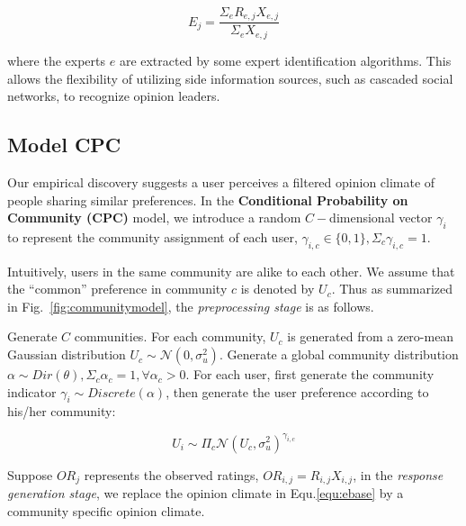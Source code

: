 \documentclass[sigconf]{acmart}
\begin{document}
\begin{equation}\label{eexpert}
E_j = \frac{\Sigma_e R_{e,j}X_{e,j}}{\Sigma_e X_{e,j}}
\end{equation}

where the experts $e$ are extracted by some expert identification algorithms. This allows the flexibility of utilizing side information sources, such as cascaded social networks, to recognize opinion leaders.

\subsection{Model CPC}
Our empirical discovery suggests a user perceives a filtered opinion climate of people sharing similar preferences. In the \textbf{Conditional Probability on Community (CPC)} model, we introduce a random $C-$dimensional vector $\gamma_i$ to represent the community assignment of each user,  $\gamma_{i,c}\in \{0,1\}, \Sigma_c \gamma_{i,c}=1$.


Intuitively, users in the same community are alike to each other. We assume that the ``common'' preference in community $c$ is denoted by $U_c$. Thus as summarized in Fig.~\ref{fig:communitymodel}, the \textit{preprocessing stage} is as follows.

Generate $C$ communities. For each community, $U_c$ is generated from a zero-mean Gaussian distribution $U_c \sim \mathcal{N}(0,\sigma_u^2)$. Generate a global community distribution $\alpha\sim Dir(\theta), \Sigma_c \alpha_c=1, \forall \alpha_c>0$. For each user, first generate the community indicator $\gamma_i \sim Discrete(\alpha)$, then generate the user preference according to his/her community:

\begin{equation}\label{equ:preferencebase}
U_i \sim \Pi_c \mathcal{N}(U_c,\sigma_u^2)^{\gamma_{i,c}}
\end{equation}

Suppose $OR_j$ represents the observed ratings, $OR_{i,j}=R_{i,j}X_{i,j}$, in the \textit{response generation stage}, we replace the opinion climate in Equ.\ref{equ:ebase} by a community specific opinion climate.
\end{document}
